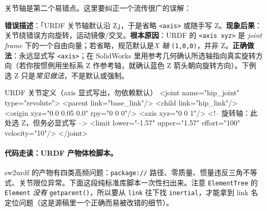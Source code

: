 关节轴是第二个易错点。这里要纠正一个流传很广的误解：

\begin{pitfall}
\textbf{错误描述}：「URDF 关节轴默认沿 Z」，于是省略 \texttt{<axis>} 或随手写 Z。\textbf{现象后果}：关节绕错误方向旋转，运动镜像/交叉。\textbf{根本原因}：URDF 的 \texttt{<axis xyz>} 是 \emph{joint frame} 下的一个自由向量；若省略，规范默认是\emph{X 轴} \texttt{(1,0,0)}，并非 Z。\textbf{正确做法}：永远显式写 \texttt{<axis>}；在 SolidWorks 里用参考几何确认所选轴指向真实旋转方向（若你按惯例用坐标系 Z 作参考轴，就确认蓝色 Z 箭头朝向旋转方向）。下例选 Z 只是\emph{常见做法}，不是默认或强制。
\end{pitfall}

\begin{codebox}[text]{URDF 关节定义（axis 显式写出，勿依赖默认）}
<joint name="hip_joint" type="revolute">
  <parent link="base_link"/>
  <child  link="hip_link"/>
  <origin xyz="0.0 0.05 0.0" rpy="0 0 0"/>
  <axis   xyz="0 0 1"/>   <!-- 旋转轴：此处选 Z，但务必显式写 -->
  <limit lower="-1.57" upper="1.57" effort="100" velocity="10"/>
</joint>
\end{codebox}

\paragraph{代码走读：URDF 产物体检脚本。}sw2urdf 的产物有四类高频问题：\texttt{package://} 路径、零质量、惯量违反三角不等式、关节限位异常。下面这段纯标准库脚本一次性扫出来。注意 \texttt{ElementTree} 的 \texttt{Element} \emph{没有} \texttt{getparent()}，所以要从 \texttt{link} 往下找 \texttt{inertial}，才能拿到 link 名定位问题（这是源稿里一个正确而易被改错的细节）。

